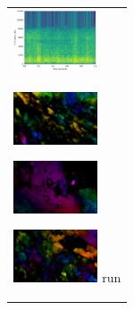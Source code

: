 \begin{enumerate}
\begin{end}
\begin{figure}[H]
\begin{tabular}{l}
\begin{minipage}{0.165\hsize}
\begin{center}
        \end{center}
      \end{minipage}
      \begin{minipage}{0.165\hsize}
        \begin{center}
          \includegraphics[clip, width=2.5cm]{./Figures/sound_run.eps}
        \end{center}
      \end{minipage}
\\  %
      \begin{minipage}{0.165\hsize}
        \begin{center}
          \includegraphics[clip, width=2.5cm]{./Figures/optic_run1.eps}
          \hspace{0.3cm} { }
        \end{center}
      \end{minipage}
      \begin{minipage}{0.165\hsize}
        \begin{center}
          \includegraphics[clip, width=2.5cm]{./Figures/optic_run2.eps}
          \hspace{0.0cm} { }
        \end{center}
      \end{minipage}
      \begin{minipage}{0.165\hsize}
        \begin{center}
          \includegraphics[clip, width=2.5cm]{./Figures/optic_run3.eps}
          \hspace{2.0cm} {run}
        \end{center}
      \end{minipage}
      \begin{minipage}{0.165\hsize}

\end{minipage}
\end{tabular}
\end{figure}
\end{end}
\end{enumerate}
